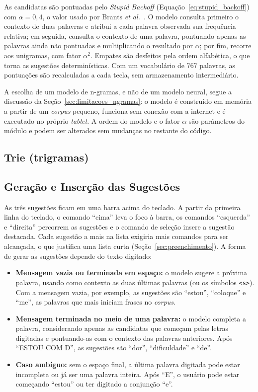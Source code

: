 As candidatas são pontuadas pelo \textit{Stupid Backoff} (Equação~\ref{eq:stupid_backoff}) com $\alpha = 0{,}4$, o valor usado por Brants \textit{et al.}~\cite{brants2007large}. O modelo consulta primeiro o contexto de duas palavras e atribui a cada palavra observada sua frequência relativa; em seguida, consulta o contexto de uma palavra, pontuando apenas as palavras ainda não pontuadas e multiplicando o resultado por $\alpha$; por fim, recorre aos unigramas, com fator $\alpha^2$. Empates são desfeitos pela ordem alfabética, o que torna as sugestões determinísticas. Com um vocabulário de 767 palavras, as pontuações são recalculadas a cada tecla, sem armazenamento intermediário.

A escolha de um modelo de n-gramas, e não de um modelo neural, segue a discussão da Seção~\ref{sec:limitacoes_ngramas}: o modelo é construído em memória a partir de um \textit{corpus} pequeno, funciona sem conexão com a internet e é executado no próprio \textit{tablet}. A ordem do modelo e o fator $\alpha$ são parâmetros do módulo e podem ser alterados sem mudanças no restante do código.

\subsection{Trie (trigramas)}

\subsection{Geração e Inserção das Sugestões} \label{sec:met_sugestoes}

As três sugestões ficam em uma barra acima do teclado. A partir da primeira linha do teclado, o comando ``cima'' leva o foco à barra, os comandos ``esquerda'' e ``direita'' percorrem as sugestões e o comando de seleção insere a sugestão destacada. Cada sugestão a mais na lista exigiria mais comandos para ser alcançada, o que justifica uma lista curta (Seção~\ref{sec:preenchimento}). A forma de gerar as sugestões depende do texto digitado:
\begin{itemize}
    \item \textbf{Mensagem vazia ou terminada em espaço:} o modelo sugere a próxima palavra, usando como contexto as duas últimas palavras (ou os símbolos \texttt{<s>}). Com a mensagem vazia, por exemplo, as sugestões são ``estou'', ``coloque'' e ``me'', as palavras que mais iniciam frases no \textit{corpus}.
    \item \textbf{Mensagem terminada no meio de uma palavra:} o modelo completa a palavra, considerando apenas as candidatas que começam pelas letras digitadas e pontuando-as com o contexto das palavras anteriores. Após ``ESTOU COM D'', as sugestões são ``dor'', ``dificuldade'' e ``de''.
    \item \textbf{Caso ambíguo:} sem o espaço final, a última palavra digitada pode estar incompleta ou já ser uma palavra inteira. Após ``E'', o usuário pode estar começando ``estou'' ou ter digitado a conjunção ``e''.
\end{itemize}

